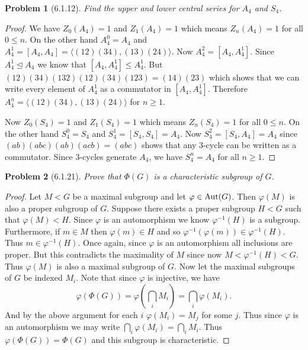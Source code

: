 \documentclass{article}
\newtheorem{problem}{Problem}
\newcommand{\normal}{\unlhd}
\newcommand{\aut}{\textup{Aut}}
\begin{document}
\begin{problem}[6.1.12]
Find the upper and lower central series for $A_4$ and $S_4$.
\end{problem}
\begin{proof}
We have $Z_0(A_4) = 1$ and $Z_1(A_4) = 1$ which means $Z_n(A_4) = 1$ for all $0 \leq n$. On the other hand $A_4^0 = A_4$ and $A_4^1 = [A_4, A_4] = \langle (12)(34), (13)(24) \rangle$. Now $A_4^2 = [A_4, A_4^1]$. Since $A_4^1 \normal A_4$ we know that $[A_4, A_4^1] \leq A_4^1$. But $(12)(34)(132)(12)(34)(123) = (14)(23)$ which shows that we can write every element of $A_4^1$ as a commutator in $[A_4, A_4^1]$. Therefore $A_4^n = \langle (12)(34), (13)(24) \rangle$ for $n \geq 1$.

Now $Z_0(S_4) = 1$ and $Z_1(S_4) = 1$ which means $Z_n(S_4) = 1$ for all $0 \leq n$. On the other hand $S_4^0 = S_4$ and $S_4^1 = [S_4, S_4] = A_4$. Now $S_4^2 = [S_4, A_4] = A_4$ since $(ab)(abc)(ab)(acb) = (abc)$ shows that any $3$-cycle can be written as a commutator. Since $3$-cycles generate $A_4$, we have $S_4^n = A_4$ for all $n \geq 1$.
\end{proof}

\begin{problem}[6.1.21]
\label{fchar}
Prove that $\Phi(G)$ is a characteristic subgroup of $G$.
\end{problem}
\begin{proof}
Let $M < G$ be a maximal subgroup and let $\varphi \in \aut(G)$. Then $\varphi(M)$ is also a proper subgroup of $G$. Suppose there exists a proper subgroup $H < G$ such that $\varphi(M) < H$. Since $\varphi$ is an automorphism we know $\varphi^{-1}(H)$ is a subgroup. Furthermore, if $m \in M$ then $\varphi(m) \in H$ and so $\varphi^{-1}(\varphi(m)) \in \varphi^{-1}(H)$. Thus $m \in \varphi^{-1}(H)$. Once again, since $\varphi$ is an automorphism all inclusions are proper. But this contradicts the maximality of $M$ since now $M < \varphi^{-1}(H) < G$. Thus $\varphi(M)$ is also a maximal subgroup of $G$. Now let the maximal subgroups of $G$ be indexed $M_i$. Note that since $\varphi$ is injective, we have
\[
\varphi(\Phi(G)) = \varphi \left ( \bigcap_i M_i \right ) = \bigcap_i \varphi(M_i).
\]
And by the above argument for each $i$ $\varphi(M_i) = M_j$ for some $j$. Thus since $\varphi$ is an automorphism we may write $\bigcap_i \varphi(M_i) = \bigcap_i M_i$. Thus $\varphi(\Phi(G)) = \Phi(G)$ and this subgroup is characteristic.
\end{proof}
\end{document}
